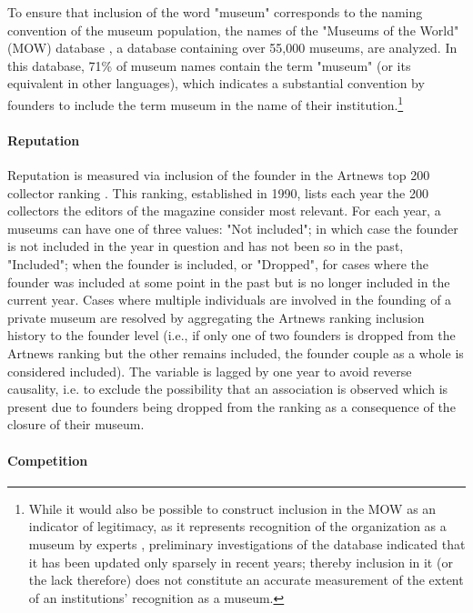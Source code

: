 \documentclass[12pt]{article}
\begin{document}
To ensure that inclusion of the word "museum" corresponds to the naming convention of the museum population, the names of the "Museums of the World" (MOW) database \parencite{deGruyter_2021_MOW}, a database containing over 55,000 museums, are analyzed.
In this database, 71\% of museum names contain the term "museum" (or its equivalent in other languages), which indicates a substantial convention by founders to include the term museum in the name of their institution.\footnote{While it would also be possible to construct inclusion in the MOW as an indicator of legitimacy, as it represents recognition of the organization as a museum by experts \parencite{Zuckerman_1999_illegitimacy}, preliminary investigations of the database indicated that it has been  updated only sparsely in recent years; thereby inclusion in it (or the lack therefore) does not constitute an accurate measurement of the extent of an institutions' recognition as a museum.}
\paragraph*{Reputation}


Reputation is measured via inclusion of the founder in the Artnews top 200 collector ranking \parencite{Artnews_ranking}.
This ranking, established in 1990, lists each year the 200 collectors the editors of the magazine consider most relevant.
For each year, a museums can have one of three values: "Not included"; in which case the founder is not included in the year in question and has not been so in the past, "Included"; when the founder is included, or "Dropped", for cases where the founder was included at some point in the past but is no longer included in the current year.
Cases where multiple individuals are involved in the founding of a private museum are resolved by aggregating the Artnews ranking inclusion history to the founder level (i.e., if only one of two founders is dropped from the Artnews ranking but the other remains included, the founder couple as a whole is considered included).
The variable is lagged by one year to avoid reverse causality, i.e. to exclude the possibility that an association is observed which is present due to founders being dropped from the ranking as a consequence of the closure of their museum.
\paragraph*{Competition}
\end{document}

